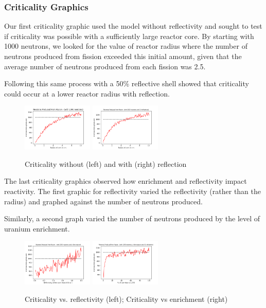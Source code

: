 \documentclass{notes}
\begin{document}
\subsubsection*{Criticality Graphics}

Our first criticality graphic used the model without reflectivity and sought to test if criticality was possible with a sufficiently large reactor core. By starting with 1000 neutrons, we looked for the value of reactor radius where the number of neutrons produced from fission exceeded this initial amount, given that the average number of neutrons produced from each fission was 2.5.

Following this same process with a 50\% reflective shell showed that criticality could occur at a lower reactor radius with reflection.

\begin{figure}[H]
    \centering
    \includegraphics[width = 0.3\textwidth]{criticality_radius_nr.png}
    \includegraphics[width = 0.3\textwidth]{criticality_radius_r.png}
    \caption{Criticality without (left) and with (right) reflection}
\end{figure}

The last criticality graphics observed how enrichment and reflectivity impact reactivity. The first graphic for reflectivity varied the reflectivity (rather than the radius) and graphed against the number of neutrons produced.

Similarly, a second graph varied the number of neutrons produced by the level of uranium enrichment.

\begin{figure}[H]
    \centering
    \includegraphics[width = 0.3\textwidth]{criticality_reflectivity_r.png}
    \includegraphics[width = 0.3\textwidth]{criticality_enrichment_r.png}
    \caption{Criticality vs. reflectivity (left); Criticality vs enrichment (right)}
\end{figure}
\end{document}
